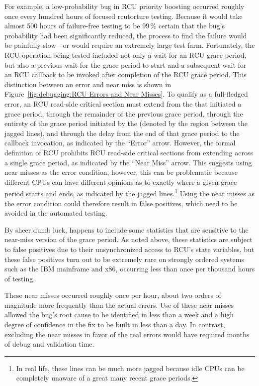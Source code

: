 For example, a low-probability bug in RCU priority boosting occurred
roughly once every hundred hours of focused rcutorture testing.
Because it would take almost 500 hours of failure-free testing to be
99\,\% certain that the bug's probability had been significantly reduced,
the  process
to find the failure would be painfully slow---or would require an extremely
large test farm.
Fortunately, the RCU operation being tested included not only a wait for
an RCU grace period, but also a previous wait for the grace period to start
and a subsequent wait for an RCU callback to be
invoked after completion of the RCU grace period.
This distinction between an  error and near miss is
shown in
Figure~\ref{fig:debugging:RCU Errors and Near Misses}.
To qualify as a full-fledged error, an RCU read-side critical section
must extend from the  that initiated a grace period,
through the remainder of the previous grace period, through the
entirety of the grace period initiated by the 
(denoted by the region between the jagged lines), and
through the delay from the end of that grace period to the callback
invocation, as indicated by the ``Error'' arrow.
However, the formal definition of RCU prohibits RCU read-side critical
sections from extending across a single grace period, as indicated by
the ``Near Miss'' arrow.
This suggests using near misses as the error condition, however, this
can be problematic because different CPUs can have different opinions
as to exactly where a given
grace period starts and ends, as indicated by the jagged lines.\footnote{
	In real life, these lines can be much more jagged because idle
	CPUs can be completely unaware of a great many recent grace
	periods.}
Using the near misses as the error condition could therefore result
in false positives, which need to be avoided in the automated
 testing.

By sheer dumb luck,  happens to include some statistics that
are sensitive to the near-miss version of the grace period.
As noted above, these statistics are subject to false positives due to
their unsynchronized access to RCU's state variables,
but these false positives turn out to be extremely rare on strongly
ordered systems such as the IBM mainframe and x86, occurring less than
once per thousand hours of testing.

These near misses occurred roughly once per hour, about two orders of
magnitude more frequently than the actual errors.
Use of these near misses allowed the bug's root cause to be identified
in less than a week and a high degree of confidence in the fix to be
built in less than a day.
In contrast, excluding the near misses in favor of the real errors would
have required months of debug and validation time.


